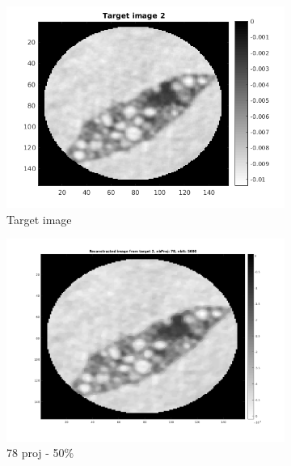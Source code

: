\documentclass[10pt,a4paper,titlepage]{article}
\begin{document}
\begin{figure}[H]
        	
        	\begin{subfigure}[b]{0.32\textwidth}   
        	    \centering 
            	\includegraphics[width=\textwidth]{Sample2/target2.png}
            	\caption{Target image}  
        	\end{subfigure}
        	\begin{subfigure}[b]{0.32\textwidth}   
        	    \centering 
        	    \includegraphics[width=\textwidth]{Sample2/L-D_5000/78_1_2.png}
        	    \caption{78 proj - 50\%}  
        	    \label{subfig:78p2L-D}
       		\end{subfigure}
        	\begin{subfigure}[b]{0.32\textwidth}  
            	\centering 

\end{subfigure}
\end{figure}
\end{document}
